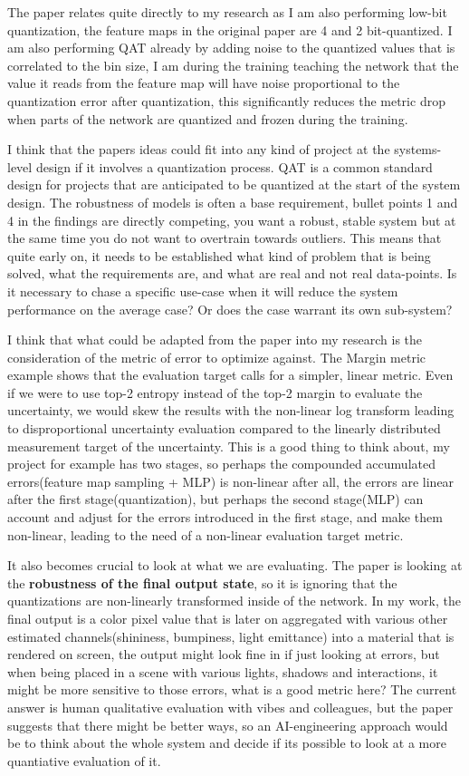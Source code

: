 \documentclass[a4paper, 11pt]{article} %
\begin{document}
The paper relates quite directly to my research as I am also performing low-bit quantization, the feature maps in the original paper are 4 and 2 bit-quantized.
I am also performing QAT already by adding noise to the quantized values that is correlated to the bin size, I am during the training teaching the network that the value
it reads from the feature map will have noise proportional to the quantization error after quantization, this significantly reduces the metric drop when parts 
of the network are quantized and frozen during the training.

I think that the papers ideas could fit into any kind of project at the systems-level design if it involves a quantization process. QAT is a common standard design for projects that are anticipated to be quantized at the start of the system design.
The robustness of models is often a base requirement, bullet points 1 and 4 in the findings are directly competing, you want a robust, stable system but at the same time you do not 
want to overtrain towards outliers. This means that quite early on, it needs to be established what kind of problem that is being solved, what the requirements are, and what are 
real and not real data-points. Is it necessary to chase a specific use-case when it will reduce the system performance on the average case? Or does the case warrant its own sub-system?

I think that what could be adapted from the paper into my research is the consideration of the metric of error to optimize against. The Margin metric example shows that the evaluation target calls for 
a simpler, linear metric. Even if we were to use top-2 entropy instead of the top-2 margin to evaluate the uncertainty, we would skew the results with the non-linear log transform
leading to disproportional uncertainty evaluation compared to the linearly distributed measurement target of the uncertainty. 
This is a good thing to think about, my project for example has two stages,
so perhaps the compounded accumulated errors(feature map sampling + MLP) is non-linear after all, the errors are linear after the first stage(quantization), but perhaps the second stage(MLP) can account and adjust for the errors introduced 
in the first stage, and make them non-linear, leading to the need of a non-linear evaluation target metric. 

It also becomes crucial to look at what we are evaluating.
The paper is looking at the \textbf{robustness of the final output state}, so it is ignoring that the quantizations are non-linearly transformed inside of the network.
In my work, the final output is a color pixel value that is later on aggregated with various other estimated channels(shininess, bumpiness, light emittance) into a material that is rendered on screen, the output might look fine in if just looking at errors, 
but when being placed in a scene with various lights, shadows and interactions, it might be more sensitive to those errors, what is a good metric here?
The current answer is human qualitative evaluation with vibes and colleagues, but the paper suggests that there might be better ways, so an AI-engineering approach would be to 
think about the whole system and decide if its possible to look at a more quantiative evaluation of it.
\end{document}
